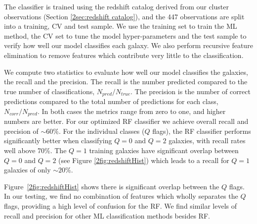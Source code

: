 The classifier is trained using the redshift catalog derived from our cluster observations (Section \ref{2sec:redshift catalog}), and the 447 observations are split into a training, CV and test sample. We use the training set to train the ML method, the CV set to tune the model hyper-parameters and the test sample to verify how well our model classifies each galaxy. We also perform recursive feature elimination to remove features which contribute very little to the classification.

We compute two statistics to evaluate how well our model classifies the galaxies, the recall and the precision. The recall is the number predicted compared to the true number of classifications, $N_{pred}/N_{true}$. The precision is the number of correct predictions compared to the total number of predictions for each class, $N_{corr}/N_{pred}$. In both cases the metrics range from zero to one, and higher numbers are better. For our optimized RF classifier we achieve overall recall and precision of $\sim60\%$. For the individual classes ($Q$ flags), the RF classifier performs significantly better when classifying $Q=0$ and $Q=2$ galaxies, with recall rates well above 70\%. The $Q=1$ training galaxies have significant overlap between $Q=0$ and $Q=2$ (see Figure \ref{2fig:redshiftHist}) which leads to a recall for $Q=1$ galaxies of only $\sim20\%$. 

Figure~\ref{2fig:redshiftHist} shows there is significant overlap between the $Q$ flags. In our testing, we find no combination of features which wholly separates the $Q$ flags, providing a high level of confusion for the RF. We find similar levels of recall and precision for other ML classification methods besides RF.

